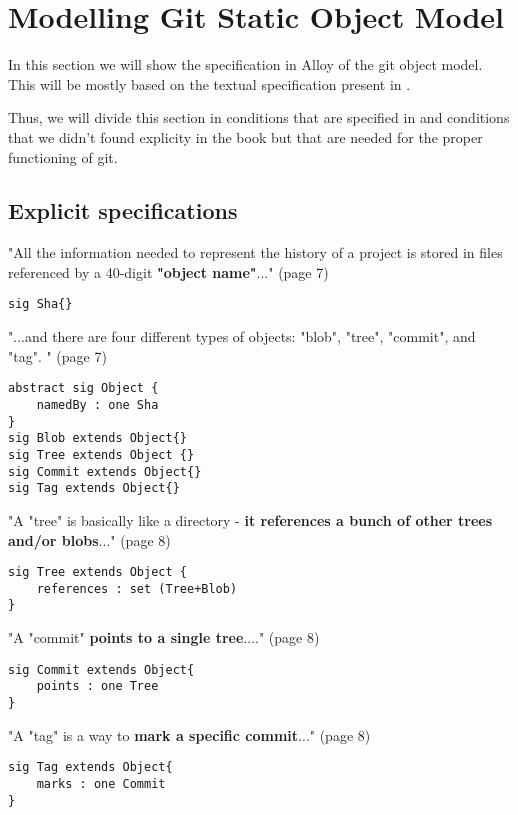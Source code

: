 \section{Modelling Git Static Object Model}

In this section we will show the specification in Alloy of the
git object model. This will be mostly based on the textual
specification present in \cite{gitComm}. \par
Thus, we will divide this section in conditions that are specified 
in \cite{gitComm} and conditions that we didn't found explicity
in the book but that are needed for the proper functioning of
git.

\subsection{Explicit specifications}

"All the information needed to represent the history
of a project is stored in files referenced by a 
40-digit {\bf "object name"}..." (page 7)

\begin{lstlisting}
sig Sha{}
\end{lstlisting}

"...and there are four different types of objects: "blob",
"tree", "commit", and "tag". " (page 7)

\begin{lstlisting}
abstract sig Object {
	namedBy : one Sha
}
sig Blob extends Object{}
sig Tree extends Object {}
sig Commit extends Object{}
sig Tag extends Object{}
\end{lstlisting}

"A "tree" is basically like a directory - {\bf it references a bunch
of other trees and/or blobs}..." (page 8)

\begin{lstlisting}
sig Tree extends Object {
	references : set (Tree+Blob)
}
\end{lstlisting}

"A "commit" {\bf points to a single tree}...." (page 8)

\begin{lstlisting}
sig Commit extends Object{
	points : one Tree
}
\end{lstlisting}

"A "tag" is a way to { \bf mark a specific commit}..." (page 8)

\begin{lstlisting}
sig Tag extends Object{
	marks : one Commit
}
\end{lstlisting}

